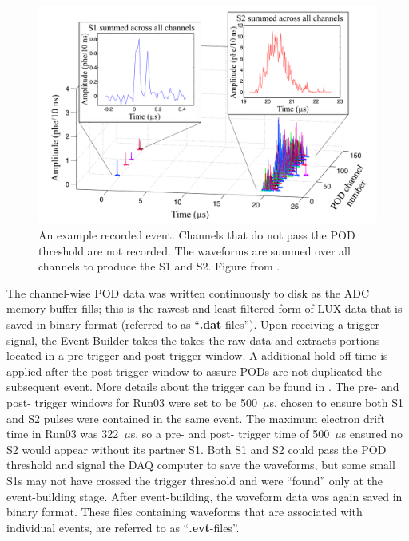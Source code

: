 \begin{figure}[htbp]
\begin{center}
\includegraphics[width=\textwidth]{figures/lux/sample_waveform.png}
\caption{An example recorded event. Channels that do not pass the POD threshold are not recorded. The waveforms are summed over all channels to produce the S1 and S2. Figure from \cite{LUXTrigger}. }
\label{fig:waveforms}
\end{center}
\end{figure}

The channel-wise \ac{POD} data was written continuously to disk as the \ac{ADC} memory buffer fills; this is the rawest and least filtered form of \ac{LUX} data that is saved in binary format (referred to as ``\textbf{.dat}-files''). Upon receiving a trigger signal, the Event Builder takes the takes the raw data and extracts portions located in a pre-trigger and post-trigger window. A additional hold-off time is applied after the post-trigger window to assure \ac{POD}s are not duplicated the subsequent event. More details about the trigger can be found in \cite{LUXTrigger}. The pre- and post- trigger windows for Run03 were set to be 500~$\mu$s, chosen to ensure both S1 and S2 pulses were contained in the same event. The maximum electron drift time in Run03 was 322~$\mu$s, so a pre- and post- trigger time of 500~$\mu$s ensured no S2 would appear without its partner S1. Both S1 and S2 could pass the \ac{POD} threshold and signal the \ac{DAQ} computer to save the waveforms, but some small S1s may not have crossed the trigger threshold and were ``found'' only at the event-building stage. After event-building, the waveform data was again saved in binary format. These files containing waveforms that are associated with individual events, are referred to as ``\textbf{.evt}-files''.


